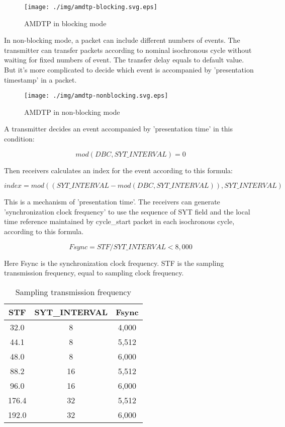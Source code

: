 \documentclass[onecolumn]{article}
\begin{document}
\begin{figure}[H]
	\centering
	\texttt{[image: ./img/amdtp-blocking.svg.eps]}
	\caption{{AMDTP in blocking mode}}
	\label{amdtp-blocking}
\end{figure}

In non-blocking mode, a packet can include different numbers of events. The transmitter can transfer packets according to nominal isochronous cycle without waiting for fixed numbers of event. The transfer delay equals to default value. But it's more complicated to decide which event is accompanied by 'presentation timestamp' in a packet.

\begin{figure}[H]
	\centering
	\texttt{[image: ./img/amdtp-nonblocking.svg.eps]}
	\caption{{AMDTP in non-blocking mode}}
	\label{amdtp-nonblockingstart}
\end{figure}

A transmitter decides an event accompanied by 'presentation time' in this condition:

\begin{equation}
	mod(DBC, SYT\_INTERVAL) = 0
\end{equation}

Then receivers calculates an index for the event according to this formula:

\begin{equation}
	index = mod((SYT\_INTERVAL - mod(DBC, SYT\_INTERVAL)), SYT\_INTERVAL)
\end{equation}

This is a mechanism of 'presentation time'. The receivers can generate 'synchronization clock frequency' to use the sequence of SYT field and the local time reference maintained by cycle\_start packet in each isochronous cycle, according to this formula.

\begin{equation}
	Fsync = STF / SYT\_INTERVAL < 8,000
\end{equation}

Here Fsync is the synchronization clock frequency. STF is the sampling transmission frequency, equal to sampling clock frequency.

\begin{table}[H]
	\centering
	\caption{{Sampling transmission frequency}}
	\label{fsync}
	\begin{tabular}{ccc} \toprule
		STF & SYT\_INTERVAL & Fsync \\ \midrule
		32.0	& 8	& 4,000 \\
		44.1	& 8	& 5,512 \\
		48.0	& 8	& 6,000 \\
		88.2	& 16	& 5,512 \\
		96.0	& 16	& 6,000 \\
		176.4	& 32	& 5,512 \\
		192.0	& 32	& 6,000 \\ \bottomrule
	\end{tabular}
\end{table}
\end{document}
